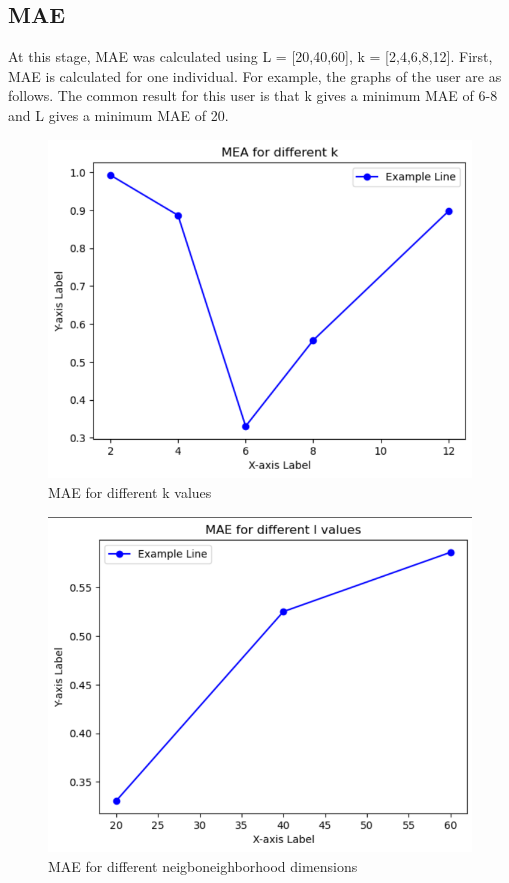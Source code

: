 \documentclass[conference]{IEEEtran}
\begin{document}
	\subsection {MAE}
	At this stage, MAE was calculated using L = [20,40,60], k = [2,4,6,8,12]. First, MAE is calculated for one individual. For example, the graphs of the user are as follows. The common result for this user is that k gives a minimum MAE of 6-8 and L gives a minimum MAE of 20.
	\begin{figure}[htbp]
		\centerline{\includegraphics[scale = 0.5]{user1k.png}}
		\caption{MAE for different k values}
		\label{fig}
	\end{figure}
	\begin{figure}[htbp]
		\centerline{\includegraphics[scale = 0.5]{l-values.png}}
		\caption{MAE for different neigboneighborhood
			dimensions}
		\label{fig}
	\end{figure}
	
\end{document}
